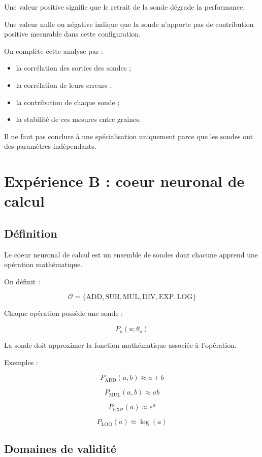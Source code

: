 \documentclass[11pt,a4paper]{article}
\begin{document}
Une valeur positive signifie que le retrait de la sonde
dégrade la performance.

Une valeur nulle ou négative indique que la sonde
n'apporte pas de contribution positive mesurable
dans cette configuration.

On complète cette analyse par :
\begin{itemize}
    \item la corrélation des sorties des sondes ;
    \item la corrélation de leurs erreurs ;
    \item la contribution de chaque sonde ;
    \item la stabilité de ces mesures entre graines.
\end{itemize}

Il ne faut pas conclure à une spécialisation uniquement
parce que les sondes ont des paramètres indépendants.

\section{Expérience B : coeur neuronal de calcul}

\subsection{Définition}

Le coeur neuronal de calcul est un ensemble de sondes
dont chacune apprend une opération mathématique.

On définit :

\[
\mathcal{O}
=
\{
\mathrm{ADD},
\mathrm{SUB},
\mathrm{MUL},
\mathrm{DIV},
\mathrm{EXP},
\mathrm{LOG}
\}
\]

Chaque opération possède une sonde :

\[
P_o(u;\theta_o)
\]

La sonde doit approximer la fonction mathématique
associée à l'opération.

Exemples :

\[
P_{\mathrm{ADD}}(a,b)\approx a+b
\]

\[
P_{\mathrm{MUL}}(a,b)\approx ab
\]

\[
P_{\mathrm{EXP}}(a)\approx e^a
\]

\[
P_{\mathrm{LOG}}(a)\approx\log(a)
\]

\subsection{Domaines de validité}
\end{document}
